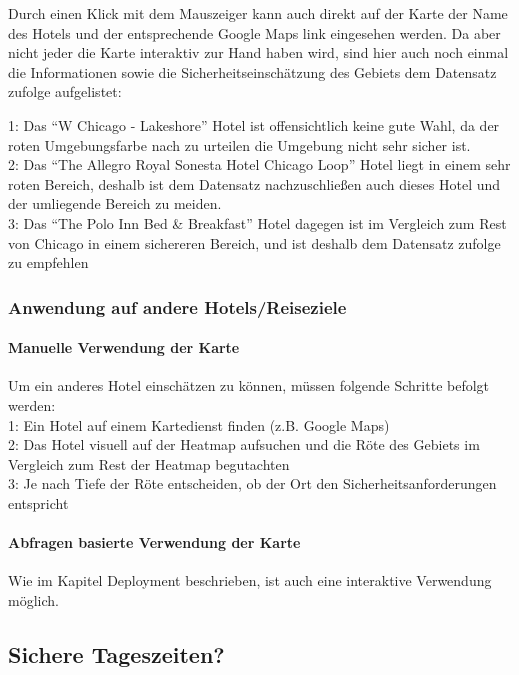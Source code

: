 \documentclass[10pt]{article}
\begin{document}
    Durch einen Klick mit dem Mauszeiger kann auch direkt auf der Karte der
Name des Hotels und der entsprechende Google Maps link eingesehen
werden. Da aber nicht jeder die Karte interaktiv zur Hand haben wird,
sind hier auch noch einmal die Informationen sowie die
Sicherheitseinschätzung des Gebiets dem Datensatz zufolge aufgelistet:

1: Das ``W Chicago - Lakeshore'' Hotel ist offensichtlich keine gute
Wahl, da der roten Umgebungsfarbe nach zu urteilen die Umgebung nicht
sehr sicher ist.\\
2: Das ``The Allegro Royal Sonesta Hotel Chicago Loop'' Hotel liegt in
einem sehr roten Bereich, deshalb ist dem Datensatz nachzuschließen auch
dieses Hotel und der umliegende Bereich zu meiden.\\
3: Das ``The Polo Inn Bed \& Breakfast'' Hotel dagegen ist im Vergleich
zum Rest von Chicago in einem sichereren Bereich, und ist deshalb dem
Datensatz zufolge zu empfehlen

\subsubsection{Anwendung auf andere
Hotels/Reiseziele}\label{anwendung-auf-andere-hotelsreiseziele}

\paragraph{Manuelle Verwendung der
Karte}\label{manuelle-verwendung-der-karte}

Um ein anderes Hotel einschätzen zu können, müssen folgende Schritte
befolgt werden:\\
1: Ein Hotel auf einem Kartedienst finden (z.B. Google Maps)\\
2: Das Hotel visuell auf der Heatmap aufsuchen und die Röte des Gebiets
im Vergleich zum Rest der Heatmap begutachten\\
3: Je nach Tiefe der Röte entscheiden, ob der Ort den
Sicherheitsanforderungen entspricht

\paragraph{Abfragen basierte Verwendung der
Karte}\label{abfragen-basierte-verwendung-der-karte}

Wie im Kapitel Deployment beschrieben, ist auch eine interaktive
Verwendung möglich.

    \subsection{Sichere Tageszeiten?}\label{sichere-tageszeiten}
\end{document}
